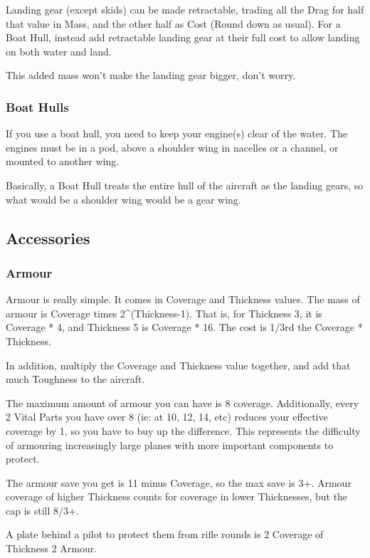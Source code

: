 \documentclass{article}
\begin{document}
Landing gear (except skids) can be made retractable, trading all the
Drag for half that value in Mass, and the other half as Cost (Round down
as usual). For a Boat Hull, instead add retractable landing gear at
their full cost to allow landing on both water and land.

This added mass won't make the landing gear bigger, don't worry.

\subsubsection{Boat Hulls}
\label{_Boat_Hulls}

If you use a boat hull, you need to keep your engine(s) clear of the
water. The engines must be in a pod, above a shoulder wing in nacelles
or a channel, or mounted to another wing.

Basically, a Boat Hull treats the entire hull of the aircraft as the
landing gears, so what would be a shoulder wing would be a gear wing.

\subsection{Accessories}
\label{_Upgrades}

\subsubsection{Armour}
\label{_Armour}

Armour is really simple. It comes in Coverage and Thickness values. The
mass of armour is Coverage times 2\^{}(Thickness-1). That is, for
Thickness 3, it is Coverage * 4, and Thickness 5 is Coverage * 16. The
cost is 1/3rd the Coverage * Thickness.

In addition, multiply the Coverage and Thickness value together, and add
that much Toughness to the aircraft.

The maximum amount of armour you can have is 8 coverage.
Additionally, every 2 Vital Parts you have over 8 (ie: at 10, 12, 14,
etc) reduces your effective coverage by 1, so you have to buy up the
difference. This represents the difficulty of armouring increasingly
large planes with more important components to protect.

The armour save you get is 11 minus Coverage, so the max save is
3+. Armour coverage of higher Thickness counts for coverage in lower
Thicknesses, but the cap is still 8/3+.

A plate behind a pilot to protect them from rifle rounds is 2
Coverage of Thickness 2 Armour.
\end{document}
